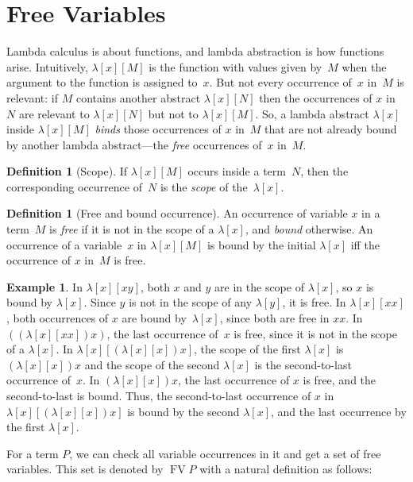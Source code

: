\documentclass[10pt,a4paper]{article}
\theoremstyle{plain}
\theoremstyle{definition}
\newtheorem{defn}[thm]{Definition}
\newtheorem{ex}[thm]{Example}
\theoremstyle{remark}
\newcommand*{\olfileid}[3]{}
\newcommand*{\olsection}[1]{\section*{#1}}
\providecommand{\lambd}{\ensuremath{\lambda}}
\providecommand{\FV}{\operatorname{FV}}
\providecommand{\FV}{\operatorname{FV}}
\begin{document}
\olfileid{lam}{syn}{fv}
\olsection{Free Variables}

Lambda calculus is about functions, and lambda abstraction is how
functions arise. Intuitively, $\lambd[x][M]$ is the function with
values given by~$M$ when the argument to the function is assigned
to~$x$. But not every occurrence of~$x$ in~$M$ is relevant: if $M$
contains another abstract $\lambd[x][N]$ then the occurrences of $x$
in~$N$ are relevant to $\lambd[x][N]$ but not to $\lambd[x][M]$.  So,
a lambda abstract $\lambd[x]$ inside $\lambd[x][M]$ \emph{binds} those
occurrences of $x$ in~$M$ that are not already bound by another lambda
abstract---the \emph{free} occurrences of~$x$ in~$M$.

\begin{defn}[Scope]
If $\lambd[x][M]$ occurs inside a term~$N$, then the corresponding
occurrence of~$N$ is the \emph{scope} of the~$\lambd[x]$.
\end{defn}


\begin{defn}[Free and bound occurrence]
  An occurrence of variable $x$ in a term~$M$ is \emph{free} if it is
  not in the scope of a $\lambd[x]$, and \emph{bound} otherwise. An
  occurrence of a variable~$x$ in $\lambd[x][M]$ is bound by the initial
  $\lambd[x]$ iff the occurrence of $x$ in~$M$ is free.
\end{defn}

\begin{ex}
  In $\lambd[x][x y]$, both $x$ and $y$ are in the scope of $\lambd[x]$,
  so $x$ is bound by $\lambd[x]$. Since $y$ is not in the scope of
  any $\lambd[y]$, it is free.  In $\lambd[x][x x]$, both occurrences
  of $x$ are bound by~$\lambd[x]$, since both are free in $xx$.  In
  $((\lambd[x][xx])x)$, the last occurrence of~$x$ is free, since it
  is not in the scope of a $\lambd[x]$. In
  $\lambd[x][(\lambd[x][x])x]$, the scope of the first $\lambd[x]$ is
  $(\lambd[x][x])x$ and the scope of the second $\lambd[x]$ is the
  second-to-last occurrence of~$x$. In $(\lambd[x][x])x$, the last
  occurrence of $x$ is free, and the second-to-last is bound.  Thus,
  the second-to-last occurrence of $x$ in $\lambd[x][(\lambd[x][x])x]$
  is bound by the second $\lambd[x]$, and the last occurrence by the
  first $\lambd[x]$.
\end{ex}

For a term $P$, we can check all variable occurrences in it and get a
set of free variables. This set is denoted by $\FV{P}$ with a natural
definition as follows:
\end{document}

